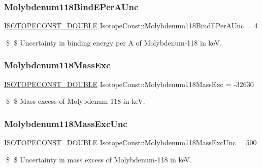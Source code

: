 \subsubsection{\texorpdfstring{Molybdenum118\+Bind\+E\+Per\+A\+Unc}{Molybdenum118BindEPerAUnc}}
{\footnotesize\ttfamily \mbox{\hyperlink{group___isotope_const-_macros_ga8f45a7272ce02c0b4c65c44636ed719a}{I\+S\+O\+T\+O\+P\+E\+C\+O\+N\+S\+T\+\_\+\+D\+O\+U\+B\+LE}} Isotope\+Const\+::\+Molybdenum118\+Bind\+E\+Per\+A\+Unc = 4}

\$ \$ Uncertainty in binding energy per A of Molybdenum-\/118 in keV. \mbox{\label{group___isotope_const-_molybdenum-_mo118_gadd0246427cbe944ebf073c47c8e44143}} 
\subsubsection{\texorpdfstring{Molybdenum118\+Mass\+Exc}{Molybdenum118MassExc}}
{\footnotesize\ttfamily \mbox{\hyperlink{group___isotope_const-_macros_ga8f45a7272ce02c0b4c65c44636ed719a}{I\+S\+O\+T\+O\+P\+E\+C\+O\+N\+S\+T\+\_\+\+D\+O\+U\+B\+LE}} Isotope\+Const\+::\+Molybdenum118\+Mass\+Exc = -\/32630}

\$ \$ Mass excess of Molybdenum-\/118 in keV. \mbox{\label{group___isotope_const-_molybdenum-_mo118_gaac71b25aef36e76a28335337e031159a}} 
\subsubsection{\texorpdfstring{Molybdenum118\+Mass\+Exc\+Unc}{Molybdenum118MassExcUnc}}
{\footnotesize\ttfamily \mbox{\hyperlink{group___isotope_const-_macros_ga8f45a7272ce02c0b4c65c44636ed719a}{I\+S\+O\+T\+O\+P\+E\+C\+O\+N\+S\+T\+\_\+\+D\+O\+U\+B\+LE}} Isotope\+Const\+::\+Molybdenum118\+Mass\+Exc\+Unc = 500}

\$ \$ Uncertainty in mass excess of Molybdenum-\/118 in keV. \mbox{\label{group___isotope_const-_molybdenum-_mo118_gafaaf8c521e59f358b771926afc898c07}} 
